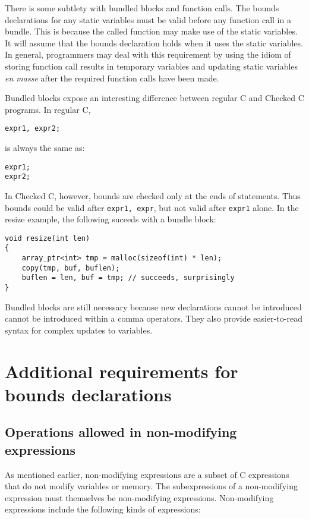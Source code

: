 There is some subtlety with bundled blocks and function calls. The
bounds declarations for any static variables must be valid before any
function call in a bundle. This is because the called function may make
use of the static variables. It will assume that the bounds declaration
holds when it uses the static variables. In general, programmers may
deal with this requirement by using the idiom of storing function call
results in temporary variables and updating static variables \textit{en
masse} after the required function calls have been made.

Bundled blocks expose an interesting difference between regular C
and Checked C programs.  In regular C, 
\begin{verbatim}
expr1, expr2;
\end{verbatim}

is always the same as:

\begin{verbatim}
expr1;
expr2;
\end{verbatim}

In Checked C, however, bounds are checked only at the ends of
statements.  Thus bounds could be valid after
\verb+expr1, expr+, but not valid after \verb+expr1+ alone.
In the resize example, the following suceeds with a bundle
block:
\begin{verbatim}
void resize(int len) 
{
    array_ptr<int> tmp = malloc(sizeof(int) * len);
    copy(tmp, buf, buflen);
    buflen = len, buf = tmp; // succeeds, surprisingly
}
\end{verbatim}
Bundled blocks are still necessary because new declarations
cannot be introduced cannot be introduced within a comma
operators.  They also provide easier-to-read syntax for
complex updates to variables.

\section{Additional requirements for bounds declarations}

\subsection{Operations allowed in non-modifying expressions}
\label{section:non-modifying-expressions}

As mentioned earlier, non-modifying expressions are a subset of C
expressions that do not modify variables or memory. The subexpressions
of a non-modifying expression must themselves be non-modifying
expressions. Non-modifying expressions include the following kinds of
expressions:

